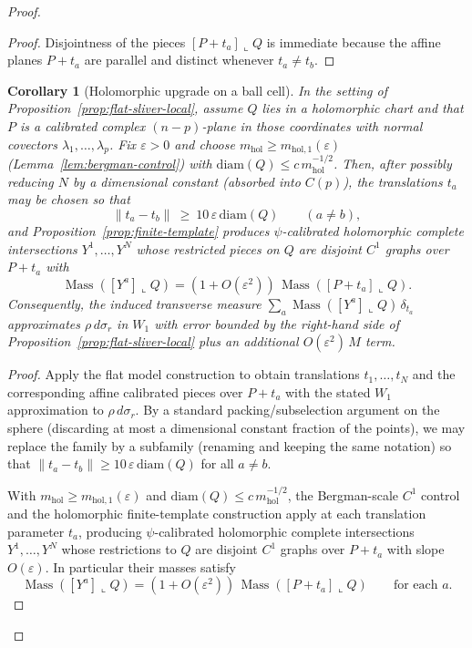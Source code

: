 \documentclass[11pt]{article}
\numberwithin{equation}{section}  %
\theoremstyle{plain}
\newtheorem{corollary}[theorem]{Corollary}
\theoremstyle{definition}
\theoremstyle{remark}
\newcommand{\mhol}{m_{\mathrm{hol}}} %
\DeclareMathOperator{\Mass}{Mass}
\begin{document}
\begin{proof}
\begin{proof}
Disjointness of the pieces $[P+t_a]\llcorner Q$ is immediate because the affine planes $P+t_a$ are parallel and distinct whenever $t_a\neq t_b$.
\end{proof}




\begin{corollary}[Holomorphic upgrade on a ball cell]\label{cor:holomorphic-flat-sliver-local}
In the setting of Proposition~\ref{prop:flat-sliver-local}, assume $Q$ lies in a holomorphic chart and that $P$ is a calibrated complex
$(n-p)$-plane in those coordinates with normal covectors $\lambda_1,\dots,\lambda_p$.
Fix $\varepsilon>0$ and choose {$\mhol\ge m_{\mathrm{hol},1}(\varepsilon)$} (Lemma~\ref{lem:bergman-control}) with $\mathrm{diam}(Q)\le c\,\mhol^{-1/2}$.
Then, after possibly reducing $N$ by a dimensional constant (absorbed into $C(p)$), the translations $t_a$ may be chosen so that
\[
\|t_a-t_b\|\ \ge\ 10\,\varepsilon\,\mathrm{diam}(Q)\qquad (a\neq b),
\]
and Proposition~\ref{prop:finite-template} produces $\psi$-calibrated holomorphic complete intersections $Y^1,\dots,Y^N$ whose restricted
pieces on $Q$ are disjoint $C^1$ graphs over $P+t_a$ with
\[
\Mass([Y^a]\llcorner Q)=(1+O(\varepsilon^2))\,\Mass([P+t_a]\llcorner Q).
\]
Consequently, the induced transverse measure $\sum_a \Mass([Y^a]\llcorner Q)\,\delta_{t_a}$ approximates $\rho\,d\sigma_r$ in $W_1$ with error
bounded by the right-hand side of Proposition~\ref{prop:flat-sliver-local} plus an additional $O(\varepsilon^2)\,M$ term.
\end{corollary}
\begin{proof}
Apply the flat model construction to obtain translations $t_1,\dots,t_N$ and the corresponding affine calibrated pieces over $P+t_a$
with the stated $W_1$ approximation to $\rho\,d\sigma_r$.
By a standard packing/subselection argument on the sphere (discarding at most a dimensional constant fraction of the points),
we may replace the family by a subfamily (renaming and keeping the same notation) so that
\(
\|t_a-t_b\|\ge 10\,\varepsilon\,\mathrm{diam}(Q)
\)
for all $a\neq b$.

With {$\mhol\ge m_{\mathrm{hol},1}(\varepsilon)$} and $\mathrm{diam}(Q)\le c\,\mhol^{-1/2}$, the Bergman-scale
 $C^1$ control and the holomorphic finite-template
construction apply at each translation parameter $t_a$, producing $\psi$-calibrated holomorphic complete intersections
$Y^1,\dots,Y^N$ whose restrictions to $Q$ are disjoint $C^1$ graphs over $P+t_a$ with slope $O(\varepsilon)$.
In particular their masses satisfy
\[
\Mass([Y^a]\llcorner Q)=(1+O(\varepsilon^2))\,\Mass([P+t_a]\llcorner Q)
\qquad\text{for each }a.
\]


\end{proof}
\end{proof}
\end{document}
